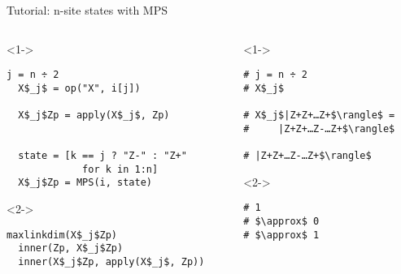 \begin{frame}[fragile]{Tutorial: n-site states with MPS}


\begin{columns}

\begin{column}{6cm}

\begin{onlyenv}<1->

\begin{lstlisting}[language=JuliaLocal, style=julia, mathescape, basicstyle=\small]
  j = n ÷ 2
  X$_j$ = op("X", i[j])

  X$_j$Zp = apply(X$_j$, Zp)


  state = [k == j ? "Z-" : "Z+"
             for k in 1:n]
  X$_j$Zp = MPS(i, state)
\end{lstlisting}

\end{onlyenv}

\begin{onlyenv}<2->

\begin{lstlisting}[language=JuliaLocal, style=julia, mathescape, basicstyle=\small]
  maxlinkdim(X$_j$Zp)
  inner(Zp, X$_j$Zp)
  inner(X$_j$Zp, apply(X$_j$, Zp))
\end{lstlisting}

\end{onlyenv}

\end{column}

\begin{column}{4cm}

\begin{onlyenv}<1->

\begin{lstlisting}[style=julia, numbers=none, mathescape, basicstyle=\small]
# j = n ÷ 2
# X$_j$

# X$_j$|Z+Z+…Z+$\rangle$ =
#     |Z+Z+…Z-…Z+$\rangle$

# |Z+Z+…Z-…Z+$\rangle$

 \end{lstlisting}

\end{onlyenv}

\begin{onlyenv}<2->

\begin{lstlisting}[style=julia, numbers=none, mathescape, basicstyle=\small]
# 1
# $\approx$ 0
# $\approx$ 1
\end{lstlisting}

\end{onlyenv}

\end{column}

\end{columns}

\end{frame}
